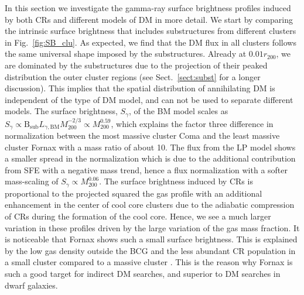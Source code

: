 \documentclass[10pt,aps,pra,reprint,amsmath,amsfonts,amssymb,showpacs,nofootinbib,floatfix]{revtex4-1}
\newcommand{\rmn}{\mathrm}
\newcommand{\B}{\rmn{B}}
\newcommand{\bsub}{\B_\rmn{sub}}
\newcommand{\rvir}{r_{200}}
\newcommand{\mvir}{M_{200}}
\begin{document}
In this section we investigate the gamma-ray surface brightness
profiles induced by both CRs and different models of DM in more
detail. We start by comparing the intrinsic surface brightness that
includes substructures from different clusters in
Fig.~\ref{fig:SB_clu}. As expected, we find that the DM flux in all
clusters follows the same universal shape imposed by the
substructures. Already at $0.01\rvir$, we are dominated by the
substructures due to the projection of their peaked distribution the
outer cluster regions (see Sect.~\ref{sect:subst} for a longer
discussion). This implies that the spatial distribution of
annihilating DM is independent of the type of DM model, and can not be
used to separate different models. The surface brightness, $S_\gamma$,
of the BM model scales as $S_\gamma\propto\bsub
L_{\gamma,\rmn{BM}}  \mvir^{-2/3} \propto \mvir^{0.59}$, which explains the
factor three difference in normalization between the most massive
cluster Coma and the least massive cluster Fornax with a mass ratio of
about 10. The flux from the LP model shows a smaller spread in the
normalization which is due to the additional contribution from SFE
with a negative mass trend, hence a flux normalization with a softer
mass-scaling of $S_\gamma\propto\mvir^{0.06}$. The surface brightness
induced by CRs is proportional to the projected squared the gas
profile with an additional enhancement in the center of cool core
clusters due to the adiabatic compression of CRs during the formation
of the cool core. Hence, we see a much larger variation in these
profiles driven by the large variation of the gas mass fraction. It is
noticeable that Fornax shows such a small surface brightness. This is
explained by the low gas density outside the BCG and the less abundant
CR population in a small cluster compared to a
massive cluster \cite{2010MNRAS.409..449P}.  This is the reason why
Fornax is such a good target for indirect DM searches, and superior
to DM searches in dwarf galaxies. 
\end{document}
